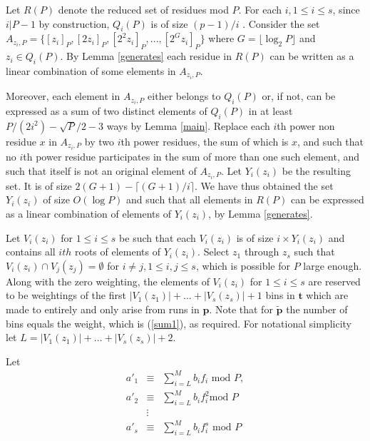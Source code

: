 




Let $R(P)$ denote the reduced set of residues mod $P$. For each
$i, 1 \leq i \leq s$, since $i | P-1$ by construction, $Q_i(P)$ is
of size $(p-1)/i$ \cite{apostol}. Consider the set
$A_{z_i,P}=\{[z_i]_P,[2z_i]_P,[2^2z_i]_P,...,[2^{G}z_i]_P\}$ where
$G=\lfloor \log_2 P \rfloor $ and $z_i \in Q_i(P)$. By Lemma
\ref{generates} each residue in $R(P)$ can be written as a linear
combination of some elements in $A_{z_i,P}$.

Moreover, each element in $A_{z_i,P}$ either belongs to $Q_i(P)$
or, if not, can be expressed as a sum of two distinct elements of
$Q_i(P)$ in at least $P/(2i^2)-\sqrt{P}/2-3$ ways by Lemma
\ref{main}. Replace each $i$th power non residue $x$ in
$A_{z_i,P}$ by two $i$th power residues, the sum of which is $x$,
and such that no  $i$th power residue participates in the sum of
more than  one such element, and such that itself is not an
original element of $A_{z_i,P}$. Let $Y_i(z_i)$ be the resulting
set. It is of size $2(G+1)-\lceil (G+1)/i \rceil$. We have thus
obtained the set $Y_i(z_i)$ of size $O(\log P)$ and such that all
elements in $R(P)$ can be expressed as a linear combination of
elements of $Y_i(z_i)$, by Lemma \ref{generates}.

Let $V_i(z_i)$ for $1 \leq i \leq s$ be such that each $V_i(z_i)$
is of size $i \times Y_i(z_i)$ and contains all $ith$ roots of
elements of $Y_i(z_i)$. Select $z_1$ through $z_s$ such that
$V_i(z_i) \cap V_j(z_j) = \emptyset$ for $i \neq j, 1 \leq i,j
\leq s $, which is possible for $P$ large enough. Along with the
zero weighting, the elements of $V_i(z_i)$ for $1 \leq i \leq s$
are reserved to be weightings of the first
$|V_1(z_1)|+\dots+|V_s(z_s)|+1$ bins in $\mathbf{t}$ which are
made to entirely and only arise from runs in $\mathbf{p}$. Note
that for $\mathbf{\tilde{p}}$ the number of bins equals the
weight, which is (\ref{sum1}), as required. For notational
simplicity let $L=|V_1(z_1)|+\dots+|V_s(z_s)|+2$.



 Let
\begin{eqnarray}\label{code1} {a'}_1 &\equiv& \sum_{i=L}^M b_i f_i
\text{ mod } P, \\ {a'}_2 &\equiv& \sum_{i=L}^M b_i f_i^2 \text{
mod } P\\ &\vdots& \\
\label{codes}{a'}_s &\equiv& \sum_{i=L}^M b_i f_i^s \text{ mod }
P\end{eqnarray}

